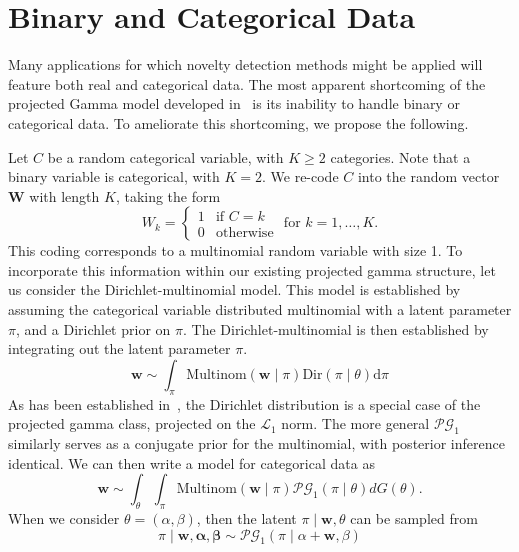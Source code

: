 
\section{Binary and Categorical Data}

Many applications for which novelty detection methods might be applied will feature both real and categorical data.  
The most apparent shortcoming of the projected Gamma model developed in~\cite{trubey:pg} is
its inability to handle binary or categorical data.  To ameliorate this shortcoming, we propose
the following.

Let $C$ be a random categorical variable, with $K \geq 2$ categories.  Note that a binary variable is categorical, with $K = 2$. We re-code $C$ into the random vector $\bm{W}$ with length $K$, taking the form
\[
    W_k = \begin{cases}
    1 &\text{if }C = k\\
    0 &\text{otherwise}
    \end{cases} \text{ for }k = 1,\ldots, K.
\]
This coding corresponds to a multinomial random variable with size 1. To incorporate this information within our existing projected gamma structure, let us consider the Dirichlet-multinomial model.  This model is established by assuming the categorical variable distributed multinomial with a latent parameter $\pi$, and a Dirichlet prior on $\pi$. The Dirichlet-multinomial is then established by integrating out the latent parameter $\pi$. 
\[
    \bm{w} \sim \int_{\pi} \text{Multinom}(\bm{w}\mid\pi)\text{Dir}(\pi\mid\theta)\text{d}\pi
\]
As has been established in~\cite{trubey:pg}, the Dirichlet distribution is a special case of the projected gamma class, projected on the $\mathcal{L}_1$ norm.  The more general $\mathcal{PG}_1$ similarly serves as a conjugate prior for the multinomial, with posterior inference identical.  We can then write a model for categorical data as
\begin{equation}
    \label{model:cat}
    \bm{w} \sim \int_{\theta}\int_{\pi}\text{Multinom}(\bm{w}\mid \pi)\mathcal{PG}_1(\pi\mid \theta)dG(\theta).
\end{equation}
When we consider $\theta = (\alpha,\beta)$, then the latent $\pi\mid \bm{w},\theta$ can be sampled from
\begin{equation}
    \label{eqn:pifc}
    \pi\mid \bm{w},\bm{\alpha},\bm{\beta} \sim \mathcal{PG}_1(\pi\mid\alpha + \bm{w}, \beta)
\end{equation}

